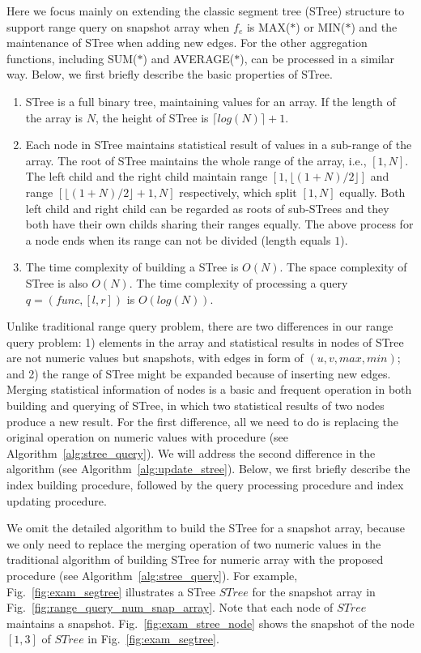 \documentclass[10pt,journal,compsoc]{IEEEtran}
\begin{document}
Here we focus mainly on extending the classic segment tree (STree) structure to support range query on snapshot array when $ f_e $ is MAX($\ast$) or MIN($\ast$) and the maintenance of STree when adding new edges. For the other aggregation functions, including SUM($\ast$) and AVERAGE($\ast$), can be processed in a similar way. Below, we first briefly describe the basic properties of STree.
\begin{enumerate}
	\item STree is a full binary tree, maintaining values for an array. If the length of the array is $ N $, the height of STree is $ \lceil log(N) \rceil+1 $.
	\item Each node in STree maintains statistical result of values in a sub-range of the array. The root of STree maintains the whole range of the array, i.e., $ [1,N] $. The left child and the right child maintain range $ [1,\lfloor(1+N)/2\rfloor] $ and range $ [\lfloor(1+N)/2\rfloor+1,N] $ respectively, which split $ [1,N] $ equally. Both left child and right child can be regarded as roots of sub-STrees and they both have their own childs sharing their ranges equally. The above process for a node ends when its range can not be divided (length equals $ 1 $).
	\item The time complexity of building a STree is $ O(N) $. The space complexity of STree is also $ O(N) $. The time complexity of processing a query $ q=(func,[l,r]) $ is $ O(log(N)) $.
\end{enumerate}

Unlike traditional range query problem, there are two differences in our range query problem: 1) elements in the array and statistical results in nodes of STree are not numeric values but snapshots, with edges in form of $ (u,v,max,min) $; and 2) the range of STree might be expanded because of inserting new edges. Merging statistical information of nodes is a basic and frequent operation in both building and querying of STree, in which two statistical results of two nodes produce a new result. For the first difference, all we need to do is replacing the original operation on numeric values with  procedure (see Algorithm~\ref{alg:stree_query}). We will address the second difference in the  algorithm (see Algorithm~\ref{alg:update_stree}).  Below, we first briefly describe the index building procedure, followed by the query processing procedure and index updating procedure.

 We omit the detailed algorithm to build the STree for a snapshot array, because we only need to replace the merging operation of two numeric values in the traditional algorithm of building STree for numeric array with the proposed  procedure  (see Algorithm~\ref{alg:stree_query}). For example, Fig.~\ref{fig:exam_segtree} illustrates a STree $ STree $ for the snapshot array in Fig.~\ref{fig:range_query_num_snap_array}. Note that each node of $ STree $ maintains a snapshot. Fig.~\ref{fig:exam_stree_node} shows the snapshot of the node $ [1,3] $ of $ STree $ in Fig.~\ref{fig:exam_segtree}.
\end{document}
